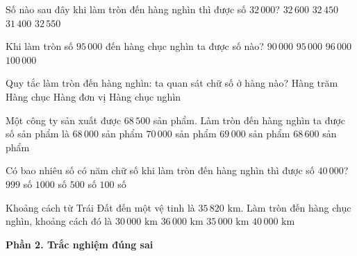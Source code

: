 \begin{ex} %
Số nào sau đây khi làm tròn đến hàng nghìn thì được số $32\,000$?
\choice
{$32\,600$}
{\True $32\,450$}
{$31\,400$}
{$32\,550$}
\end{ex}

\begin{ex} %
Khi làm tròn số $95\,000$ đến hàng chục nghìn ta được số nào?
\choice
{$90\,000$}
{$95\,000$}
{$96\,000$}
{\True $100\,000$}
\end{ex}

\begin{ex} %
Quy tắc làm tròn đến hàng nghìn: ta quan sát chữ số ở hàng nào?
\choice
{\True Hàng trăm}
{Hàng chục}
{Hàng đơn vị}
{Hàng chục nghìn}
\end{ex}

\begin{ex} %
Một công ty sản xuất được $68\,500$ sản phẩm. Làm tròn đến hàng nghìn ta được số sản phẩm là
\choice
{$68\,000$ sản phẩm}
{$70\,000$ sản phẩm}
{\True $69\,000$ sản phẩm}
{$68\,600$ sản phẩm}
\end{ex}

\begin{ex} %
Có bao nhiêu số có năm chữ số khi làm tròn đến hàng nghìn thì được số $40\,000$?
\choice
{$999$ số}
{\True $1000$ số}
{$500$ số}
{$100$ số}
\end{ex}

\begin{ex} %
Khoảng cách từ Trái Đất đến một vệ tinh là $35\,820\text{ km}$. Làm tròn đến hàng chục nghìn, khoảng cách đó là
\choice
{$30\,000\text{ km}$}
{$36\,000\text{ km}$}
{$35\,000\text{ km}$}
{\True $40\,000\text{ km}$}
\end{ex}

\textbf{Phần 2. Trắc nghiệm đúng sai}

